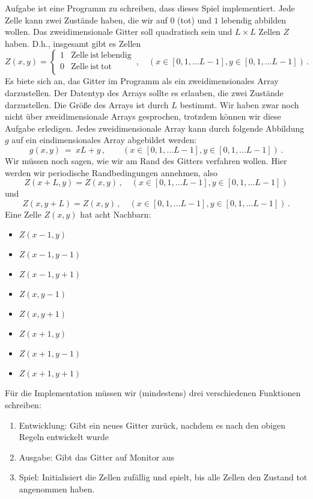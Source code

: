 \documentclass{article}[12pt]
\begin{document}
Aufgabe ist eine Programm zu schreiben, dass dieses Spiel implementiert.
Jede Zelle kann zwei Zustände haben, die wir auf $0$ (tot) und $1$ lebendig abbilden wollen.
Das zweidimensionale Gitter soll quadratisch sein und $L\times L$ Zellen $Z$ haben.
D.h., insgesamt gibt es Zellen
\begin{equation}
  Z(x,y) = \begin{cases}
    1 & \mathrm{Zelle~ist~lebendig} \\0  & \mathrm{Zelle~ist~tot} \\
  \end{cases}
  \,,\quad (x\in[0,1,\ldots L-1], y\in[0,1,\ldots L-1])\,.
\end{equation}
Es biete sich an, das Gitter im Programm als ein zweidimensionales Array darzustellen.
Der Datentyp des Arrays sollte es erlauben, die zwei Zustände darzustellen.
Die Größe des Arrays ist durch $L$ bestimmt.
Wir haben zwar noch nicht über zweidimensionale Arrays gesprochen, trotzdem können wir diese Aufgabe erledigen. 
Jedes zweidimensionale Array kann durch folgende Abbildung $g$ auf ein eindimensionales Array abgebildet werden:
\begin{equation}
  g(x,y)\ =\ xL + y\,,\qquad (x\in[0,1,\ldots L-1], y\in[0,1,\ldots L-1])\,.
\end{equation}
Wir müssen noch sagen, wie wir am Rand des Gitters verfahren wollen.
Hier werden wir periodische Randbedingungen annehmen, also
\begin{equation}
  Z(x+L,y)= Z(x,y)\,,\quad (x\in[0,1,\ldots L-1], y\in[0,1,\ldots L-1])
\end{equation}
und
\begin{equation}
  Z(x,y+L)= Z(x, y)\,,\quad (x\in[0,1,\ldots L-1], y\in[0,1,\ldots L-1])\,.
\end{equation}
Eine Zelle $Z(x,y)$ hat acht Nachbarn:
\begin{itemize}
\item  $Z(x-1,y)$
\item  $Z(x-1,y-1)$
\item  $Z(x-1,y+1)$
\item  $Z(x,y-1)$
\item  $Z(x,y+1)$
\item  $Z(x+1,y)$
\item  $Z(x+1,y-1)$
\item  $Z(x+1,y+1)$
\end{itemize}
Für die Implementation müssen wir (mindestens) drei verschiedenen Funktionen schreiben:
\begin{enumerate}
\item Entwicklung: Gibt ein neues Gitter zurück, nachdem es nach den obigen Regeln entwickelt wurde
\item Ausgabe: Gibt das Gitter auf Monitor aus
\item Spiel: Initialisiert die Zellen zufällig und \glqq spielt\grqq, bis alle Zellen den Zustand tot angenommen haben.
\end{enumerate}
\end{document}

